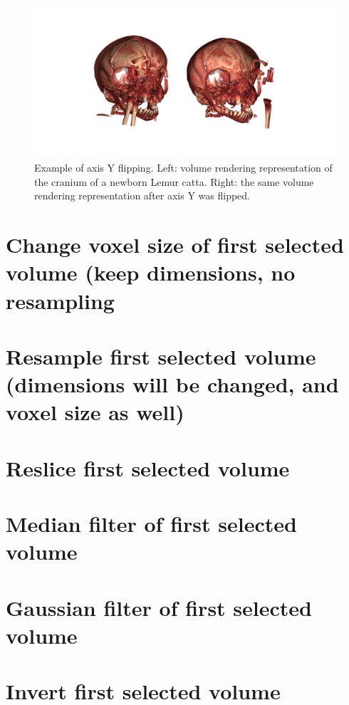 \begin{figure}
  \centering
  \includegraphics[scale=0.5]{images/14/flip_swap/flip_y_example.png}
\caption{ Example of axis Y flipping. Left: volume rendering representation of the cranium of a newborn Lemur catta. Right: the same volume rendering representation after axis Y was flipped.}	
\label{flip_y_example}
 \end{figure}



\section{Change voxel size of first selected volume (keep dimensions, no resampling}

\section{Resample first selected volume (dimensions will be changed, and voxel size as well)}

\section{Reslice first selected volume}

\section{Median filter of first selected volume}

\section{Gaussian filter of first selected volume}

\section{Invert first selected volume}

